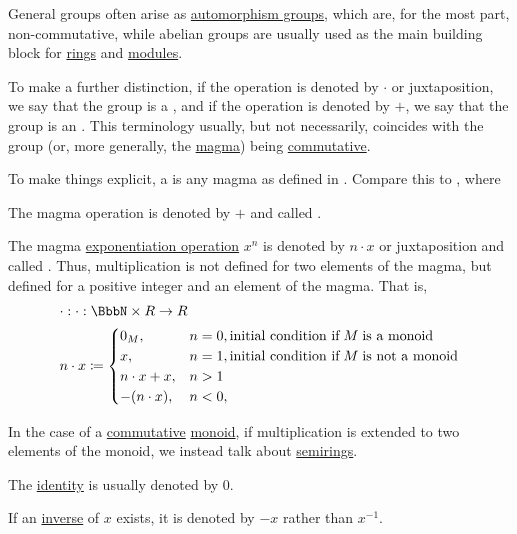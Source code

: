 \begin{remark}\label{rem:additive_magma}
  General groups often arise as \hyperref[def:automorphism_group]{automorphism groups}, which are, for the most part, non-commutative, while abelian groups are usually used as the main building block for \hyperref[def:ring]{rings} and \hyperref[def:module]{modules}.

  To make a further distinction, if the operation is denoted by \( \cdot \) or juxtaposition, we say that the group is a , and if the operation is denoted by \( + \), we say that the group is an . This terminology usually, but not necessarily, coincides with the group (or, more generally, the \hyperref[def:magma]{magma}) being \hyperref[def:magma/commutative]{commutative}.

  To make things explicit, a  is any magma as defined in . Compare this to , where
  \begin{thmenum}
     The magma operation is denoted by \( + \) and called .

     The magma \hyperref[def:magma/exponentiation]{exponentiation operation} \( x^n \) is denoted by \( n \cdot x \) or juxtaposition and called . Thus, multiplication is not defined for two elements of the magma, but defined for a positive integer and an element of the magma. That is,
    \begin{equation}\label{eq:rem:additive_magma/multiplication}
      \begin{aligned}
        &\cdot: \cdot: \BbbN \times R \to R \\
        &n \cdot x \coloneqq \begin{cases}
          0_M,           &n = 0, \T{initial condition if} M \T{is a monoid} \\
          x,             &n = 1, \T{initial condition if} M \T{is not a monoid} \\
          n \cdot x + x, &n > 1 \\
          -(n \cdot x),  &n < 0, \\
        \end{cases}
      \end{aligned}
    \end{equation}

    In the case of a \hyperref[def:magma/commutative]{commutative} \hyperref[def:monoid]{monoid}, if multiplication is extended to two elements of the monoid, we instead talk about \hyperref[def:semiring]{semirings}.

     The \hyperref[def:monoid]{identity} is usually denoted by \( 0 \).

     If an \hyperref[def:monoid_inverse]{inverse} of \( x \) exists, it is denoted by \( -x \) rather than \( x^{-1} \).
  \end{thmenum}
\end{remark}

